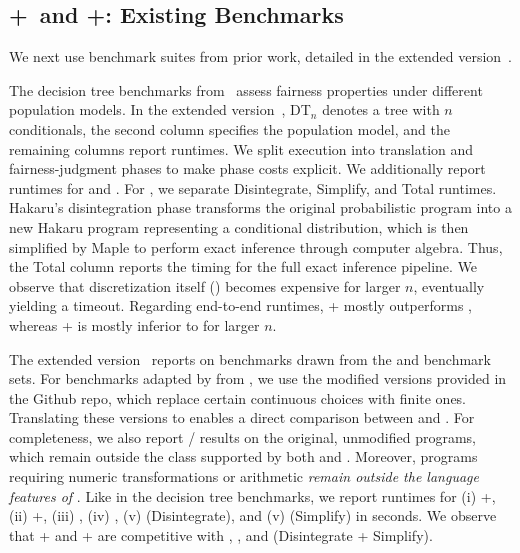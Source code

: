 

\subsection{\Slicebf+\Dicebf~and \Slicebf+\Roulettebf: Existing Benchmarks}\label{sec:fairness-benchmarks}

We next use benchmark suites from prior work, detailed in the extended version~\cite[\S~G, Tables~5--7]{Wu2026SliceExtended}.

The decision tree benchmarks from~\cite{albarghouthi2017fairsquare} assess fairness properties under different population models. In the extended version~\cite[Tables~5 and~6]{Wu2026SliceExtended}, DT$_n$ denotes a tree with $n$ conditionals, the second column specifies the population model, and the remaining columns report runtimes. We split \SPPL{} execution into translation and fairness-judgment phases to make phase costs explicit. We additionally report runtimes for \PSI{} and \Hakaru{}. For \Hakaru{}, we separate Disintegrate, Simplify, and Total runtimes. Hakaru's disintegration phase transforms the original probabilistic program into a new Hakaru program representing a conditional distribution, which is then simplified by Maple to perform exact inference through computer algebra. Thus, the Total column reports the timing for the full exact inference pipeline. We observe that discretization itself (\Slice) becomes expensive for larger $n$, eventually yielding a timeout. Regarding end-to-end runtimes, \Slice{}+\Dice{} mostly outperforms \SPPL{}, whereas \Slice{}+\Roulette{} is mostly inferior to \SPPL{} for larger $n$.

The extended version~\cite[Table~7]{Wu2026SliceExtended} reports on benchmarks drawn from the \PSI{} and \SPPL{} benchmark sets. For benchmarks adapted by \SPPL{} from \PSI{}, we use the modified versions provided in the \SPPL{} Github repo, which replace certain continuous choices with finite ones. Translating these versions to \Slice{} enables a direct comparison between \Slice{} and \SPPL{}. For completeness, we also report \PSI{}/\Hakaru{} results on the original, unmodified programs, which remain outside the class supported by both \Slice{} and \SPPL{}. Moreover, programs requiring numeric transformations or arithmetic \emph{remain outside the language features of \Slice}. Like in the decision tree benchmarks, we report runtimes for (i) \Slice{}+\Dice{}, (ii) \Slice{}+\Roulette{}, (iii) \SPPL{}, (iv) \PSI{}, (v) \Hakaru{} (Disintegrate), and (v) \Hakaru{} (Simplify) in seconds. We observe that \Slice{}+\Dice{} and \Slice{}+\Roulette{} are competitive with \SPPL{}, \PSI{}, and \Hakaru{} (Disintegrate + Simplify).
